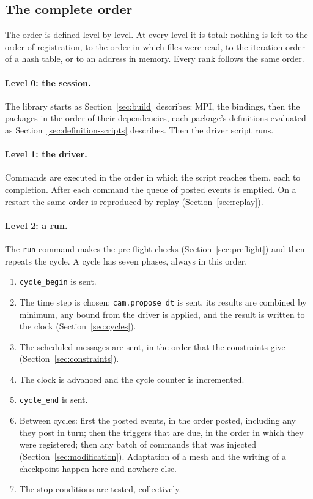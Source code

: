 \documentclass[11pt,a4paper]{article}
\newcommand{\code}[1]{\texttt{#1}}
\begin{document}
\subsection{The complete order}
\label{sec:order}

The order is defined level by level.  At every level it is total: nothing
is left to the order of registration, to the order in which files were
read, to the iteration order of a hash table, or to an address in memory.
Every rank follows the same order.

\paragraph{Level 0: the session.}  The library starts as
Section~\ref{sec:build} describes: MPI, the bindings, then the packages in
the order of their dependencies, each package's definitions evaluated as
Section~\ref{sec:definition-scripts} describes.  Then the driver script
runs.

\paragraph{Level 1: the driver.}  Commands are executed in the order in
which the script reaches them, each to completion.  After each command the
queue of posted events is emptied.  On a restart the same order is
reproduced by replay (Section~\ref{sec:replay}).

\paragraph{Level 2: a run.}  The \code{run} command makes the pre-flight
checks (Section~\ref{sec:preflight}) and then repeats the cycle.  A cycle
has seven phases, always in this order.

\begin{enumerate}
  \item \code{cycle\_begin} is sent.
  \item The time step is chosen: \code{cam.propose\_dt} is sent, its results
        are combined by minimum, any bound from the driver is applied, and
        the result is written to the clock (Section~\ref{sec:cycles}).
  \item The scheduled messages are sent, in the order that the constraints
        give (Section~\ref{sec:constraints}).
  \item The clock is advanced and the cycle counter is incremented.
  \item \code{cycle\_end} is sent.
  \item Between cycles: first the posted events, in the order posted,
        including any they post in turn; then the triggers that are due, in
        the order in which they were registered; then any batch of commands
        that was injected (Section~\ref{sec:modification}).  Adaptation of a
        mesh and the writing of a checkpoint happen here and nowhere else.
  \item The stop conditions are tested, collectively.
\end{enumerate}
\end{document}
